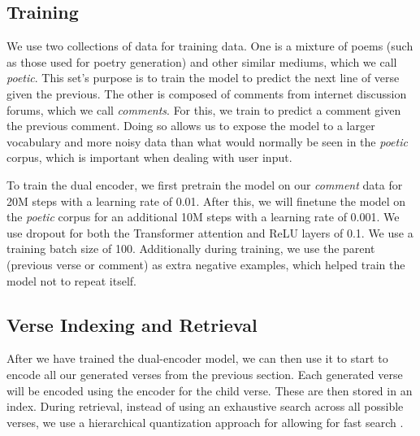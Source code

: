 \documentclass[11pt]{article}
\begin{document}
\subsection{Training}

We use two collections of data for training data.
One is a mixture of poems (such as those used for poetry generation) and other similar mediums, which we call \textit{poetic}.
This set's purpose is to train the model to predict the next line of verse given the previous.
The other is composed of comments from internet discussion forums, which we call \textit{comments}.
For this, we train to predict a comment given the previous comment.
Doing so allows us to expose the model to a larger vocabulary and more noisy data than what would normally be seen in the \textit{poetic} corpus, which is important when dealing with user input.

To train the dual encoder, we first pretrain the model on our \textit{comment} data for 20M steps with a learning rate of 0.01.
After this, we will finetune the model on the \textit{poetic} corpus for an additional 10M steps with a learning rate of 0.001.
We use dropout for both the Transformer attention and ReLU layers of 0.1.
We use a training batch size of 100.
Additionally during training, we use the parent (previous verse or comment) as extra negative examples, which helped train the model not to repeat itself.

\subsection{Verse Indexing and Retrieval}

After we have trained the dual-encoder model, we can then use it to start to encode all our generated verses from the previous section.
Each generated verse will be encoded using the encoder for the child verse.
These are then stored in an index.
During retrieval, instead of using an exhaustive search across all possible verses, we use a hierarchical quantization approach for allowing for fast search \cite{guo2016,wu2017}.


\end{document}
